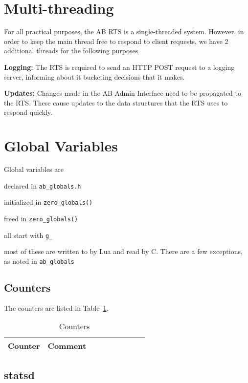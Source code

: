 \documentclass[letterpaper]{article}
\begin{document}
\section{Multi-threading}

For all practical purposes, the AB RTS is a single-threaded system.
However, in order to keep the main thread free to respond to client requests, we
have 2 additional threads for the following purposes
\be
\item {\bf Logging:} The RTS is required to send an HTTP POST request to a
  logging server, informing about it bucketing decisions that it makes. 
\item {\bf Updates:} Changes made in the AB Admin Interface need to be
  propagated to the RTS. These cause updates to the data structures that the RTS
  uses to respond quickly.
  \ee

\section{Global Variables}

Global variables are 
\bi
\item declared in \verb+ab_globals.h+
\item initialized in \verb+zero_globals()+
\item freed in \verb+zero_globals()+
\item all start with \verb+g_+
\item most of these are written to by Lua and read by C. There are a few
  exceptions, as noted in \verb+ab_globals+
\ei

\subsection{Counters}

The counters are listed in Table~\ref{tbl_counters}.
\begin{table}[hb]
\centering
\begin{tabular}{|l||l|l|l|l|l|l|l|l|}  \hline \hline
  {\bf Counter } & {\bf Comment} \\ \hline

\hline
\end{tabular}
\caption{Counters}
\label{tbl_counters}
\end{table}


\subsection{statsd}
\end{document}
